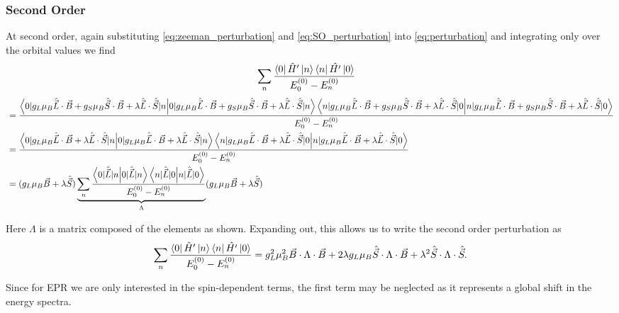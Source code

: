 \subsubsection{Second Order}
At second order, again substituting \eqref{eq:zeeman_perturbation} and \eqref{eq:SO_perturbation} into \eqref{eq:perturbation} 
and integrating only over the orbital values 
we find 
\begin{equation*}
   \begin{align}
       &\sum_{n}\frac{\bra{0} \hat{H}' \ket{n} \bra{n} \hat{H'}\ket{0}}{E_0^{(0)} - E_n^{(0)}}
   \end{align}
\end{equation*}
\begin{equation}
    \begin{align}
 &=\frac{\braket{0 |g_L \mu_B \hat{\vec{L}}\cdot\vec{B} + g_S \mu_B \hat{\vec{S}}\cdot\vec{B} +\lambda\hat{\vec{L}}\cdot \hat{\vec{S}}  | n } \braket{n |g_L \mu_B \hat{\vec{L}}\cdot\vec{B} + g_S \mu_B \hat{\vec{S}}\cdot\vec{B}+\lambda\hat{\vec{L}}\cdot \hat{\vec{S}}| 0}}{E_0^{(0)} - E_n^{(0)}}\\ 
 &=\frac{\braket{0 |g_L \mu_B \hat{\vec{L}}\cdot\vec{B} + \lambda\hat{\vec{L}}\cdot \hat{\vec{S}}  | n } \braket{n |g_L \mu_B \hat{\vec{L}}\cdot\vec{B} + \lambda\hat{\vec{L}}\cdot \hat{\vec{S}}| 0}}{E_0^{(0)} - E_n^{(0)}}\\ 
 &= (g_L \mu_B \vec{B} + \lambda \hat{\vec{S}})\underbrace{\sum_n \frac{\braket{0 |\hat{\vec{L}} | n}\braket{n |\hat{\vec{L}} | 0}}{E_0^{(0)} - E_n^{(0)}}}_{{\Lambda}}(g_L \mu_B \vec{B} + \lambda \hat{\vec{S}})%
    \end{align}
\end{equation}

Here $\Lambda$ is a matrix composed of the elements as shown. Expanding out, this allows us to write the second order perturbation as 
\begin{equation}
    \sum_{n}\frac{\bra{0} \hat{H}' \ket{n} \bra{n} \hat{H'}\ket{0}}{E_0^{(0)} - E_n^{(0)}} = g_L^2\mu_B^2 \vec{B} \cdot \Lambda \cdot \vec{B} + 2\lambda g_L\mu_B\hat{\vec{S}}\cdot\Lambda\cdot\vec{B} + \lambda^2 \hat{\vec{S}}\cdot \Lambda \cdot \hat{\vec{S}}.
    \label{eq:second_order}
\end{equation}

Since for EPR we are only interested in the spin-dependent terms, the first term may be neglected as it represents a global shift in the energy spectra. 

